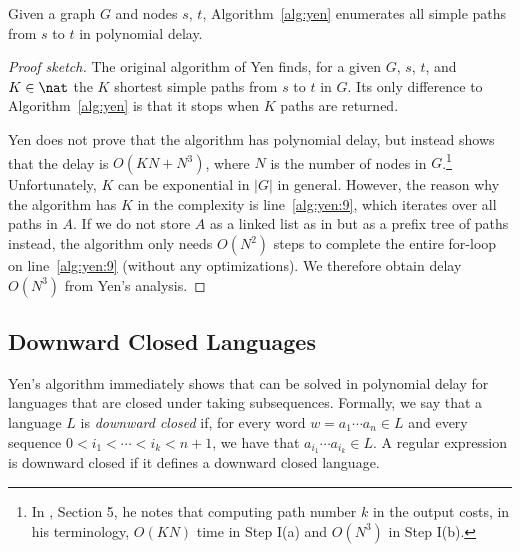 \documentclass[a4paper,english]{lipics-v2016}
\theoremstyle{plain}
\begin{document}
\begin{theorem}
  Given a graph $G$ and nodes $s$, $t$, Algorithm~\ref{alg:yen}
  enumerates all simple paths from $s$ to $t$ in polynomial delay.
\end{theorem}
\begin{proof}[Proof sketch]
  The original algorithm of Yen \cite{yen} finds, for a given $G$,
  $s$, $t$, and $K \in \nat$ the $K$ shortest simple paths from $s$ to
  $t$ in $G$. Its only difference to Algorithm~\ref{alg:yen} is that
  it stops when $K$ paths are returned.

  Yen does not prove that the algorithm has polynomial delay, but
  instead shows that the delay is $O(KN + N^3)$, where $N$ is the
  number of nodes in $G$.\footnote{In \cite{yen}, Section 5, he notes
    that computing path number $k$ in the output costs, in his
    terminology, $O(KN)$ time in Step I(a) and $O(N^3)$ in Step
    I(b).} Unfortunately,
  $K$ can be exponential in $|G|$ 
  in general. However, the reason why
  the algorithm has $K$ in the complexity is line~\ref{alg:yen:9},
  which iterates over all paths in $A$. If we do not store $A$ as a
  linked list as in \cite{yen} but as a prefix tree of paths instead,
  the algorithm only needs $O(N^2)$ steps to complete the entire
  for-loop on line~\ref{alg:yen:9} (without any optimizations). We
  therefore obtain delay $O(N^3)$ from Yen's analysis.
\end{proof}

\subsection{Downward Closed Languages}\label{sec:downwardclosed}
Yen's algorithm immediately shows that \enumnodespaths can be solved in
polynomial delay for languages that are closed under taking
subsequences. Formally, we say that a language $L$ is \emph{downward
  closed} if, for every word $w = a_1 \cdots a_n \in L$ and every
sequence $0 < i_1 < \cdots < i_k < n+1$, we have that $a_{i_1}
\cdots a_{i_k} \in L$. A regular expression is downward closed if it
defines a downward closed language.
\end{document}
